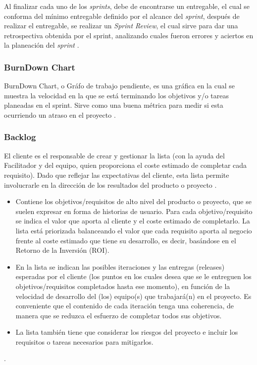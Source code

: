 \documentclass[10pt]{article}
\begin{document}
\setlength{\parskip}{2mm}

Al finalizar cada uno de los \textit{sprints}, debe de encontrarse un entregable, el cual se conforma del mínimo entregable definido por el alcance del \textit{sprint}, después de realizar el entregable, se realizar un \textit{Sprint Review}, el cual sirve para dar una retrospectiva obtenida por el sprint, analizando cuales fueron errores y aciertos en la planeación del \textit{sprint} \cite{IEEEreferencias:Ref21}.\newline

\subsubsection{BurnDown Chart}
BurnDown Chart, o Gráfo de trabajo pendiente, es una gráfica en la cual se muestra la velocidad en la que se está terminando los objetivos y/o tareas planeadas en el sprint. Sirve como una buena métrica para medir si esta ocurriendo un atraso en el proyecto \cite{IEEEreferencias:Ref22}.

\subsubsection{Backlog}
El cliente es el responsable de crear y gestionar la lista (con la ayuda del Facilitador y del equipo, quien proporciona el coste estimado de completar cada requisito). Dado que reflejar las expectativas del cliente, esta lista permite involucrarle en la dirección de los resultados del producto o proyecto \cite{IEEEreferencias:Ref23}.

\begin{itemize}
    \item Contiene los objetivos/requisitos de alto nivel del producto o proyecto, que se suelen expresar en forma de historias de usuario. Para cada objetivo/requisito se indica el valor que aporta al cliente y el coste estimado de completarlo. La lista está priorizada balanceando el valor que cada requisito aporta al negocio frente al coste estimado que tiene su desarrollo, es decir, basándose en el Retorno de la Inversión (ROI).
    
    \item En la lista se indican las posibles iteraciones y las entregas (releases) esperadas por el cliente (los puntos en los cuales desea que se le entreguen los objetivos/requisitos completados hasta ese momento), en función de la velocidad de desarrollo del (los) equipo(s) que trabajará(n) en el proyecto. Es conveniente que el contenido de cada iteración tenga una coherencia, de manera que se reduzca el esfuerzo de completar todos sus objetivos.
    \item La lista también tiene que considerar los riesgos del proyecto e incluir los requisitos o tareas necesarios para mitigarlos.

\end{itemize}
\cite{IEEEreferencias:Ref23}.
\end{document}
